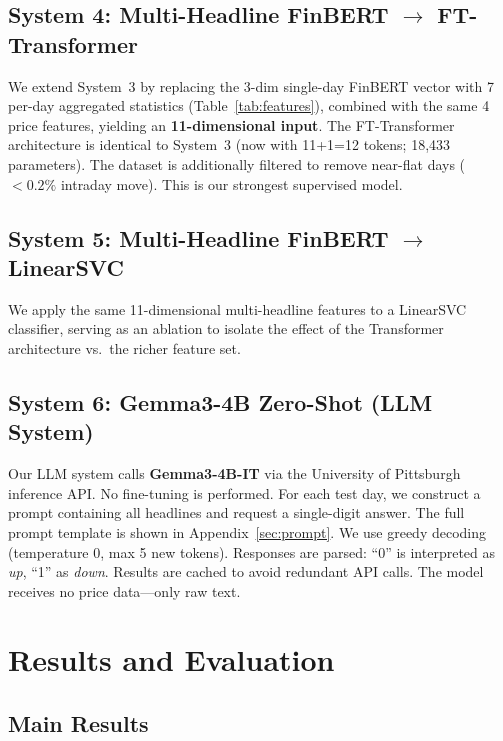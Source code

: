\documentclass[11pt]{article}
\begin{document}
\subsection{System 4: Multi-Headline FinBERT $\to$ FT-Transformer}

We extend System~3 by replacing the 3-dim single-day FinBERT vector with 7 per-day aggregated statistics (Table~\ref{tab:features}), combined with the same 4 price features, yielding an \textbf{11-dimensional input}. The FT-Transformer architecture is identical to System~3 (now with 11+1=12 tokens; 18,433 parameters). The dataset is additionally filtered to remove near-flat days ($< 0.2\%$ intraday move). This is our strongest supervised model.

\subsection{System 5: Multi-Headline FinBERT $\to$ LinearSVC}

We apply the same 11-dimensional multi-headline features to a LinearSVC classifier, serving as an ablation to isolate the effect of the Transformer architecture vs.\ the richer feature set.

\subsection{System 6: Gemma3-4B Zero-Shot (LLM System)}

Our LLM system calls \textbf{Gemma3-4B-IT} \citep{gemma2025} via the University of Pittsburgh inference API. No fine-tuning is performed. For each test day, we construct a prompt containing all headlines and request a single-digit answer. The full prompt template is shown in Appendix~\ref{sec:prompt}. We use greedy decoding (temperature 0, max 5 new tokens). Responses are parsed: ``0'' is interpreted as \emph{up}, ``1'' as \emph{down}. Results are cached to avoid redundant API calls. The model receives no price data—only raw text.

\section{Results and Evaluation}
\label{sec:results}

\subsection{Main Results}
\end{document}
